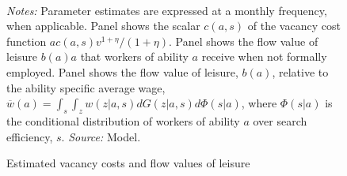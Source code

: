 \begin{figure}[!htb]
  \centering
  \caption{Estimated vacancy costs and flow values of leisure\label{figure: estimates}}
  \prefigvspace
  \\
  \postfigvspace
  \begin{minipage}[t]{1\columnwidth}%
    \begin{spacing}{0.75}
      \emph{\scriptsize{}Notes: }{\scriptsize{}Parameter estimates are expressed at a monthly frequency, when applicable. Panel  shows the scalar $c(a,s)$ of the vacancy cost function $ac(a,s)v^{1+\eta}/(1+\eta)$. Panel  shows the flow value of leisure $b(a)a$ that workers of ability $a$ receive when not formally employed. Panel  shows the flow value of leisure, $b(a)$, relative to the ability specific average wage, $\overline{w}(a)=\int_{s}\int_z w(z|a,s)dG(z|a,s)d\Phi(s|a)$, where $\Phi(s|a)$ is the conditional distribution of workers of ability $a$ over search efficiency, $s$. %
      \emph{\scriptsize{}Source: } Model.}
    \end{spacing}
  \end{minipage}
\end{figure}


